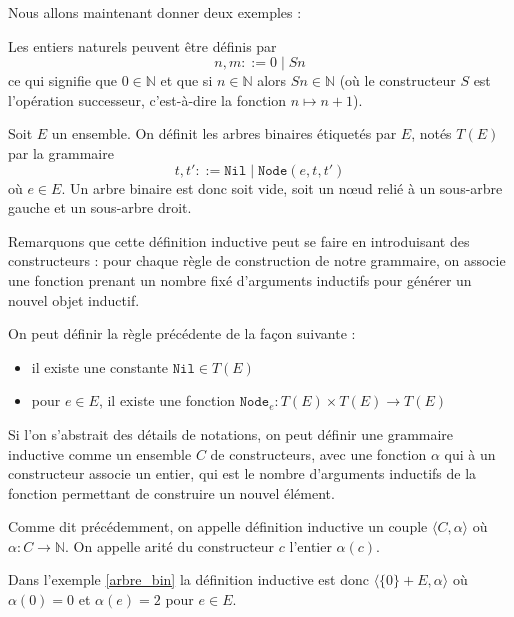 Nous allons maintenant donner deux exemples :

\begin{expl}
    Les entiers naturels peuvent être définis par $$n,m ::= 0 \mid S n$$ ce qui signifie que $0\in \mathbb N$ et que si $n\in\mathbb N$ alors $S n \in\mathbb N$ (où le constructeur $S$ est l'opération successeur, c'est-à-dire la fonction $n \mapsto n+1$).
\end{expl}

\begin{expl}
    Soit $E$ un ensemble. On définit les arbres binaires étiquetés par $E$, notés $T(E)$ par la grammaire $$t,t' ::= \texttt{Nil}\mid \texttt{Node}(e,t,t')$$ où $e\in E$. Un arbre binaire est donc soit vide, soit un n\oe ud relié à un sous-arbre gauche et un sous-arbre droit.
\end{expl}

Remarquons que cette définition inductive peut se faire en introduisant des constructeurs : pour chaque règle de construction de notre grammaire, on associe une \og fonction \fg{} prenant un nombre fixé d'arguments inductifs pour générer un nouvel objet inductif.

\begin{expl}\label{arbre_bin}
    On peut définir la règle précédente de la façon suivante : 
    \begin{itemize}[label = $\bullet$]
        \item il existe une constante $\texttt{Nil} \in T(E)$
        \item pour $e \in E$, il existe une fonction $\texttt{Node}_e : T(E)\times T(E)\to T(E)$
    \end{itemize}
\end{expl}

Si l'on s'abstrait des détails de notations, on peut définir une grammaire inductive comme un ensemble $C$ de constructeurs, avec une fonction $\alpha$ qui à un constructeur associe un entier, qui est le nombre d'arguments inductifs de la fonction permettant de construire un nouvel élément. 

\begin{defi}
    Comme dit précédemment, on appelle définition inductive un couple $\langle C,\alpha\rangle$ où $\alpha : C \to\mathbb N$. On appelle arité du constructeur $c$ l'entier $\alpha(c)$.
\end{defi}

Dans l'exemple \ref{arbre_bin} la définition inductive est donc $\langle \{0\} + E,\alpha\rangle$ où $\alpha(0) = 0$ et $\alpha(e) = 2$ pour $e\in E$.


